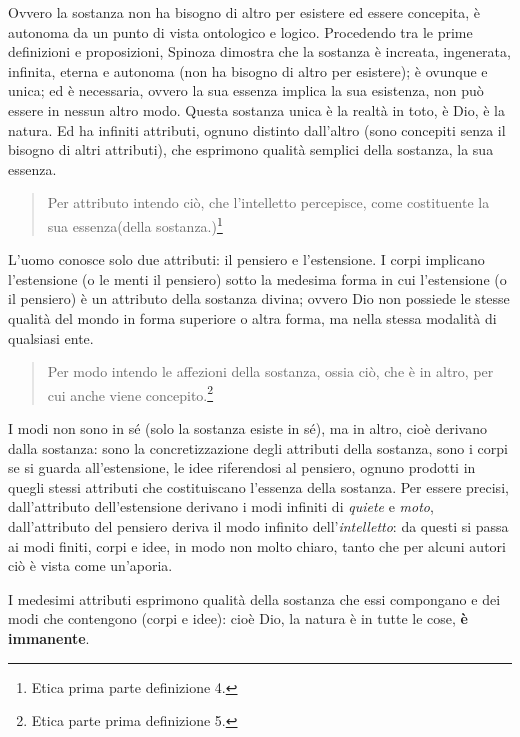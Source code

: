 Ovvero la sostanza non ha bisogno di altro per esistere ed essere concepita, è autonoma da un punto di vista ontologico e logico. Procedendo tra le prime definizioni e proposizioni, Spinoza dimostra che la sostanza è increata, ingenerata, infinita, eterna e autonoma (non ha bisogno di altro per esistere); è ovunque e unica; ed è necessaria, ovvero la sua essenza implica la sua esistenza, non può essere in nessun altro modo.
Questa sostanza unica è la realtà in toto, è Dio, è la natura. 
Ed ha infiniti attributi, ognuno distinto dall'altro (sono concepiti senza il bisogno di altri attributi), che esprimono qualità semplici della sostanza, la sua essenza.

\begin{quotation}
	\small Per attributo intendo ciò, che l'intelletto percepisce, come costituente la sua essenza(della sostanza.)\footnote{Etica prima parte definizione 4.}
\end{quotation}

L'uomo conosce solo due attributi: il pensiero e l'estensione. I corpi implicano l'estensione (o le menti il pensiero) sotto la medesima forma in cui l'estensione (o il pensiero) è un attributo della sostanza divina; ovvero Dio non possiede le stesse qualità del mondo in forma superiore o altra forma, ma nella stessa modalità di qualsiasi ente.

\begin{quotation}
	\small Per modo intendo le affezioni della sostanza, ossia ciò, che è in altro, per cui anche viene concepito.\footnote{Etica parte prima definizione 5.}
\end{quotation}

I modi non sono in sé (solo la sostanza esiste in sé), ma in altro, cioè derivano dalla sostanza: sono la concretizzazione degli attributi della sostanza, sono i corpi se si guarda all'estensione, le idee riferendosi al pensiero, ognuno prodotti in quegli stessi attributi che costituiscano l'essenza della sostanza. Per essere precisi, dall'attributo dell'estensione derivano i modi infiniti di \textit{quiete} e \textit{moto}, dall'attributo del pensiero deriva il modo infinito dell'\textit{intelletto}: da questi si passa ai modi finiti, corpi e idee, in modo non molto chiaro, tanto che per alcuni autori ciò è vista come un'aporia.

I medesimi attributi esprimono qualità della sostanza che essi compongano e dei modi che contengono (corpi e idee): cioè Dio, la natura è in tutte le cose, \textbf{è immanente}.


